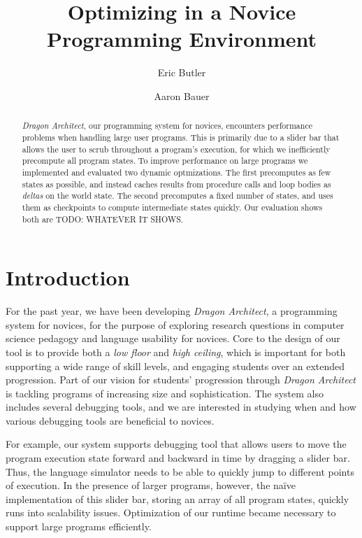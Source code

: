 \documentclass{sig-alternate}
\newcommand{\da}{\emph{Dragon Architect}}
\newcommand{\todo}[1]{{\color{red} TODO: #1}}
\begin{document}
\title{Optimizing in a Novice Programming Environment}
\author{Eric Butler \and Aaron Bauer}
\maketitle{}

\begin{abstract}
\da{}, our programming system for novices, encounters performance problems when handling large user programs. This is primarily due to a slider bar that allows the user to scrub throughout a program's execution, for which we inefficiently precompute all program states. To improve performance on large programs we implemented and evaluated two dynamic optmizations. The first precomputes as few states as possible, and instead caches results from procedure calls and loop bodies as \emph{deltas} on the world state. The second precomputes a fixed number of states, and uses them as checkpoints to compute intermediate states quickly. Our evaluation shows both are \todo{WHATEVER IT SHOWS}.
\end{abstract}

\section{Introduction}

For the past year, we have been developing \da, a programming system for novices, for the purpose of exploring research questions in computer science pedagogy and language usability for novices. Core to the design of our tool is to provide both a \emph{low floor} and \emph{high ceiling}, which is important for both supporting a wide range of skill levels, and engaging students over an extended progression. Part of our vision for students' progression through \da{} is tackling programs of increasing size and sophistication. The system also includes several debugging tools, and we are interested in studying when and how various debugging tools are beneficial to novices. 

For example, our system supports debugging tool that allows users to move the program execution state forward and backward in time by dragging a slider bar. Thus, the language simulator needs to be able to quickly jump to different points of execution. In the presence of larger programs, however, the na\"{i}ve implementation of this slider bar, storing an array of all program states, quickly runs into scalability issues. Optimization of our runtime became necessary to support large programs efficiently. 
\end{document}
